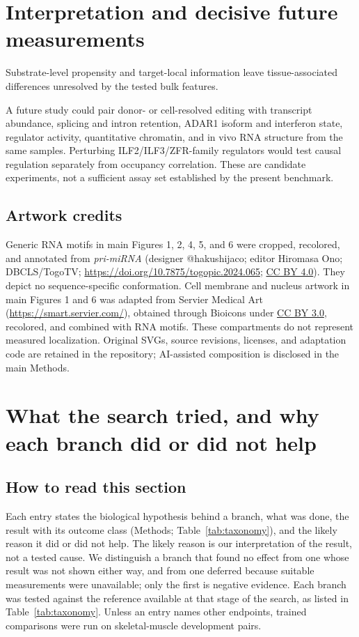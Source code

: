 \documentclass[9pt,twoside]{pnas-new}
\begin{document}
\section{Interpretation and decisive future measurements}\label{si:interpretation}

Substrate-level propensity and target-local information leave tissue-associated differences unresolved by the tested bulk features.

A future study could pair donor- or cell-resolved editing with transcript abundance, splicing and intron retention, ADAR1 isoform and interferon state, regulator activity, quantitative chromatin, and in vivo RNA structure from the same samples. Perturbing ILF2/ILF3/ZFR-family regulators would test causal regulation separately from occupancy correlation. These are candidate experiments, not a sufficient assay set established by the present benchmark.

\subsection*{Artwork credits}

Generic RNA motifs in main Figures 1, 2, 4, 5, and 6 were cropped, recolored, and annotated from \emph{pri-miRNA} (designer @hakushijaco; editor Hiromasa Ono; DBCLS/TogoTV; \url{https://doi.org/10.7875/togopic.2024.065}; \href{https://creativecommons.org/licenses/by/4.0/}{CC BY 4.0}). They depict no sequence-specific conformation. Cell membrane and nucleus artwork in main Figures 1 and 6 was adapted from Servier Medical Art (\url{https://smart.servier.com/}), obtained through Bioicons under \href{https://creativecommons.org/licenses/by/3.0/}{CC BY 3.0}, recolored, and combined with RNA motifs. These compartments do not represent measured localization. Original SVGs, source revisions, licenses, and adaptation code are retained in the repository; AI-assisted composition is disclosed in the main Methods.

\section{What the search tried, and why each branch did or did not help}\label{si:why}

\subsection*{How to read this section}
Each entry states the biological hypothesis behind a branch, what was done, the result with its outcome class (Methods; Table~\ref{tab:taxonomy}), and the likely reason it did or did not help. The likely reason is our interpretation of the result, not a tested cause. We distinguish a branch that found no effect from one whose result was not shown either way, and from one deferred because suitable measurements were unavailable; only the first is negative evidence. Each branch was tested against the reference available at that stage of the search, as listed in Table~\ref{tab:taxonomy}. Unless an entry names other endpoints, trained comparisons were run on skeletal-muscle development pairs.
\end{document}
